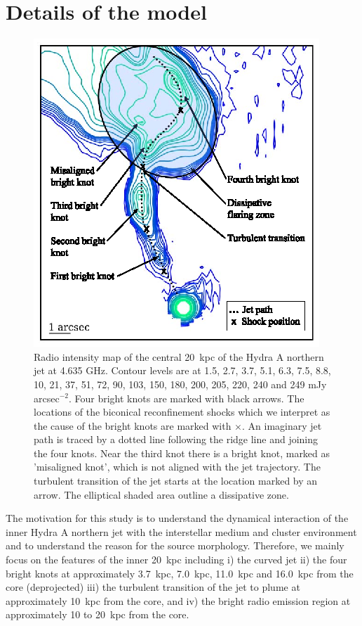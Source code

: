 \documentclass[useAMS, usenatbib]{mn2e}
\begin{document}
\section{Details of the model}\label{s:model}
\begin{figure}
\centering
\includegraphics[width=\linewidth]{fig1.eps}
\caption{Radio intensity map of the central 20~kpc of the Hydra A northern jet at 4.635 GHz. Contour levels are at 1.5, 2.7, 3.7, 5.1, 6.3, 7.5, 8.8, 10, 21, 37, 51, 72, 90, 103, 150, 180, 200, 205, 220, 240 and 249 mJy arcsec$^{-2}$. Four bright knots are marked with black arrows. The locations of the biconical reconfinement shocks which we interpret as the cause of the bright knots \citep{nawaz14a} are marked with $\times$. An imaginary jet path is traced by a dotted line following the ridge line and joining the four knots. Near the third knot there is a bright knot, marked as 'misaligned knot', which is not aligned with the jet trajectory. The turbulent transition of the jet starts at the location marked by an arrow. The elliptical shaded area outline a dissipative zone.}
\label{f:obs}
\end{figure}

The motivation for this study is to understand the dynamical interaction of the inner Hydra A northern jet with the interstellar medium and cluster environment and to understand the reason for the source morphology. Therefore, we mainly focus on the features of the inner 20~kpc including i) the curved jet ii) the four bright knots at approximately 3.7~kpc, 7.0~kpc, 11.0~kpc and 16.0~kpc from the core (deprojected) iii) the turbulent transition of the jet to plume at approximately 10~kpc from the core, and iv) the bright radio emission region at approximately 10 to 20~kpc from the core. 
\end{document}
